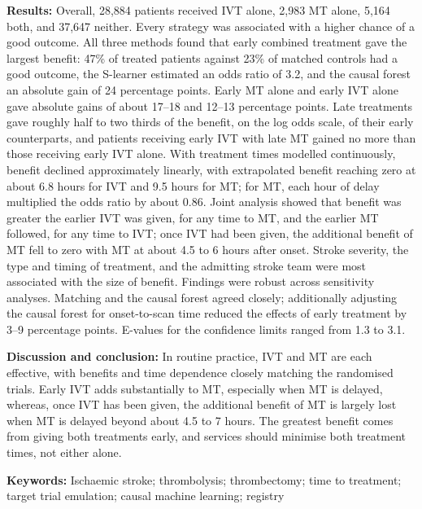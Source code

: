 \textbf{Results:} Overall, 28,884 patients received IVT alone, 2,983 MT alone, 5,164 both, and 37,647 neither. Every strategy was associated with a higher chance of a good outcome. All three methods found that early combined treatment gave the largest benefit: 47\% of treated patients against 23\% of matched controls had a good outcome, the S-learner estimated an odds ratio of 3.2, and the causal forest an absolute gain of 24 percentage points. Early MT alone and early IVT alone gave absolute gains of about 17--18 and 12--13 percentage points. Late treatments gave roughly half to two thirds of the benefit, on the log odds scale, of their early counterparts, and patients receiving early IVT with late MT gained no more than those receiving early IVT alone. With treatment times modelled continuously, benefit declined approximately linearly, with extrapolated benefit reaching zero at about 6.8 hours for IVT and 9.5 hours for MT; for MT, each hour of delay multiplied the odds ratio by about 0.86. Joint analysis showed that benefit was greater the earlier IVT was given, for any time to MT, and the earlier MT followed, for any time to IVT; once IVT had been given, the additional benefit of MT fell to zero with MT at about 4.5 to 6 hours after onset. Stroke severity, the type and timing of treatment, and the admitting stroke team were most associated with the size of benefit. Findings were robust across sensitivity analyses. Matching and the causal forest agreed closely; additionally adjusting the causal forest for onset-to-scan time reduced the effects of early treatment by 3--9 percentage points. E-values for the confidence limits ranged from 1.3 to 3.1.

\textbf{Discussion and conclusion:} In routine practice, IVT and MT are each effective, with benefits and time dependence closely matching the randomised trials. Early IVT adds substantially to MT, especially when MT is delayed, whereas, once IVT has been given, the additional benefit of MT is largely lost when MT is delayed beyond about 4.5 to 7 hours. The greatest benefit comes from giving both treatments early, and services should minimise both treatment times, not either alone.

\fi

\textbf{Keywords:} Ischaemic stroke; thrombolysis; thrombectomy; time to treatment; target trial emulation; causal machine learning; registry

